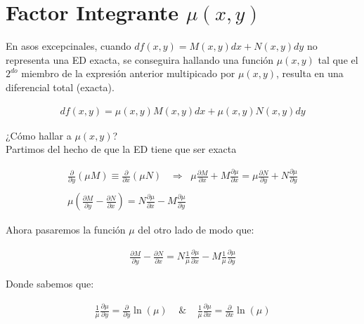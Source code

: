\chapter{Factor Integrante \(\displaystyle \mu(x,y)\)}

En asos excepcinales, cuando \(\displaystyle df(x,y)=M(x,y)dx+N(x,y)dy\) no representa una ED exacta, se conseguira hallando una función \(\displaystyle \mu(x,y)\) tal que el \(\displaystyle 2^{do}\) miembro de la expresión anterior multipicado por \(\displaystyle \mu(x,y)\), resulta en una diferencial total (exacta).

\begin{equation*}
    \begin{gathered}
        df(x,y)=\mu(x,y)M(x,y)dx+\mu(x,y)N(x,y)dy
    \end{gathered}
\end{equation*}

¿Cómo hallar a \(\displaystyle \mu(x,y)\)?\\

Partimos del hecho de que la ED tiene que ser exacta

\begin{equation*}
    \begin{gathered}
        \frac{\partial}{\partial{y}}(\mu M)\equiv \frac{\partial}{\partial{x}}(\mu N)\;\;\;\Rightarrow\;\;\mu\frac{\partial{M}}{\partial{x}}+M\frac{\partial{\mu}}{\partial{x}}=\mu\frac{\partial{N}}{\partial{y}}+N\frac{\partial{\mu}}{\partial{y}}\\\\
        \mu\left(\frac{\partial{M}}{\partial{y}}-\frac{\partial{N}}{\partial{x}}\right)=N\frac{\partial{\mu}}{\partial{x}}-M\frac{\partial{\mu}}{\partial{y}}
    \end{gathered}
\end{equation*}

Ahora pasaremos la función \(\displaystyle \mu\) del otro lado de modo que:

\begin{equation*}
    \begin{gathered}
        \frac{\partial{M}}{\partial{y}}-\frac{\partial{N}}{\partial{x}}=N\frac{1}{\mu}\frac{\partial{\mu}}{\partial{x}}-M\frac{1}{\mu}\frac{\partial{\mu}}{\partial{y}}
    \end{gathered}
\end{equation*}

Donde sabemos que:

\begin{equation*}
    \begin{gathered}
        \frac{1}{\mu}\frac{\partial{\mu}}{\partial{y}}=\frac{\partial}{\partial{y}}\ln(\mu)\;\;\;\;\&\;\;\;\;\frac{1}{\mu}\frac{\partial{\mu}}{\partial{x}}=\frac{\partial}{\partial{x}}\ln(\mu)
    \end{gathered}
\end{equation*}

